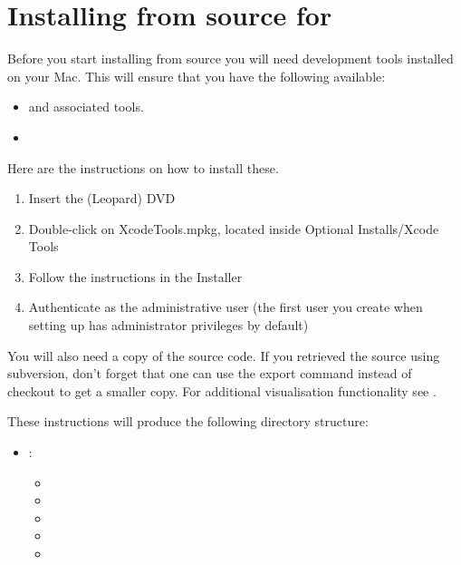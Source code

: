 %
%
%

\section{Installing from source for \macosx}
\label{sec:srcmac}

Before you start installing from source you will need \macosx development tools installed on your Mac.
This will ensure that you have the following available:
\begin{itemize}
\item {} and associated tools.
\item {}
\end{itemize}

Here are the instructions on how to install these.
\begin{enumerate}
\item Insert the  (Leopard) DVD
\item Double-click on XcodeTools.mpkg, located inside Optional Installs/Xcode Tools
\item Follow the instructions in the Installer
\item Authenticate as the administrative user (the first user you create when setting up \macosx has administrator privileges by default)
\end{enumerate}

You will also need a copy of the \esfinley source code.
If you retrieved the source using subversion, don't forget that one can use the export command instead of checkout to get a smaller copy.
For additional visualisation functionality see .

These instructions will produce the following directory structure:
\begin{itemize}
 \item[] : \begin{itemize}
  \item[] 
  \item[] 
  \item[] 
  \item[] 
  \item[] 
 \end{itemize}
\end{itemize}

